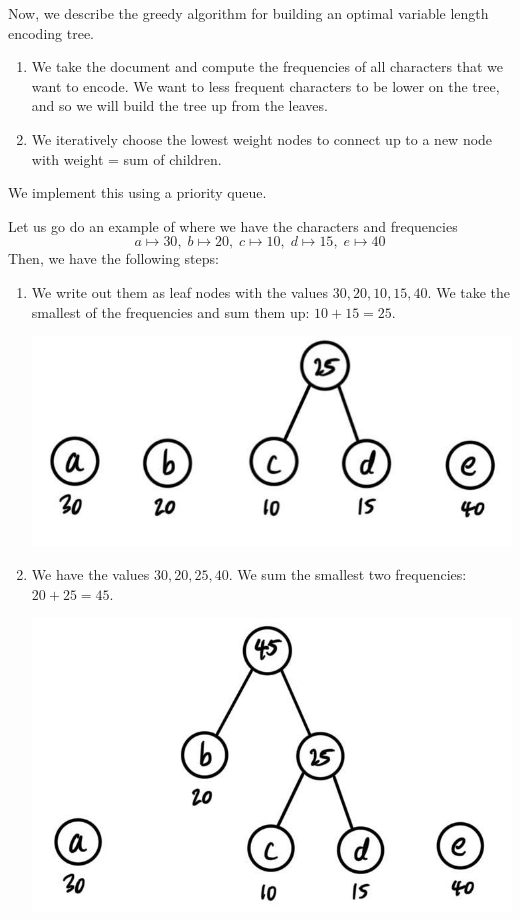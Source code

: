 \documentclass{article}
\begin{document}
    Now, we describe the greedy algorithm for building an optimal variable length encoding tree. 
    \begin{enumerate}
        \item We take the document and compute the frequencies of all characters that we want to encode. We want to less frequent characters to be lower on the tree, and so we will build the tree up from the leaves. 
        \item We iteratively choose the lowest weight nodes to connect up to a new node with weight = sum of children. 
    \end{enumerate}
    We implement this using a priority queue. 

    \begin{example}
    Let us go do an example of where we have the characters and frequencies 
    \[a \mapsto 30, \; b \mapsto 20, \; c \mapsto 10, \; d \mapsto 15, \; e \mapsto 40\]
    Then, we have the following steps: 
    \begin{enumerate}
        \item We write out them as leaf nodes with the values $30, 20, 10, 15, 40$. We take the smallest of the frequencies and sum them up: $10 + 15 = 25$. 
        \begin{center}
            \includegraphics[scale=0.3]{img/step_1.jpg}
        \end{center}
        \item We have the values $30, 20, 25, 40$. We sum the smallest two frequencies: $20 + 25 = 45$. 
        \begin{center}
            \includegraphics[scale=0.3]{img/step_2.jpg}

\end{center}
\end{enumerate}
\end{example}
\end{document}
